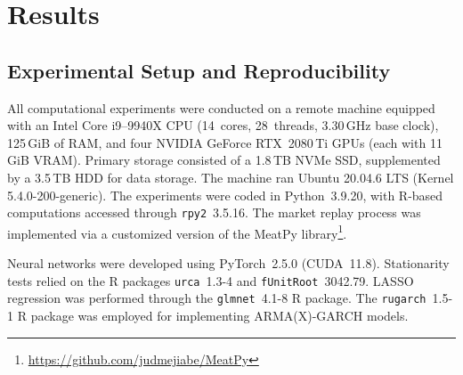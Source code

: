 \documentclass[10pt,a4paper,oneside]{article}
\begin{document}


\section{Results}
\label{sec:results}

\subsection{Experimental Setup and Reproducibility}
\label{subsec:exp_setup}

All computational experiments were conducted on a remote machine equipped with an Intel Core i9--9940X CPU (14~cores, 28~threads, 3.30\,GHz base clock), 125\,GiB of RAM, and four NVIDIA GeForce RTX~2080\,Ti GPUs (each with 11\,GiB VRAM). Primary storage consisted of a 1.8\,TB NVMe SSD, supplemented by a 3.5\,TB HDD for data storage. The machine ran Ubuntu 20.04.6 LTS (Kernel 5.4.0-200-generic). The experiments were coded in Python~3.9.20, with R-based computations accessed through \verb|rpy2|~3.5.16. The market replay process was implemented via a customized version of the MeatPy library\footnote{\url{https://github.com/judmejiabe/MeatPy}}.

Neural networks were developed using PyTorch~2.5.0 (CUDA~11.8). Stationarity tests relied on the R packages \verb|urca|~1.3-4 and \verb|fUnitRoot|~3042.79. LASSO regression was performed through the \verb|glmnet|~4.1-8 R package. The \verb|rugarch|~1.5-1 R package was employed for implementing ARMA(X)-GARCH models.
\end{document}
